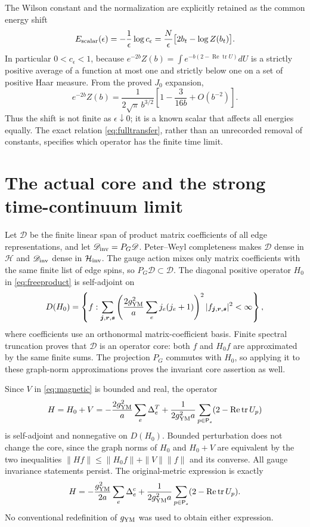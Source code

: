\documentclass[11pt]{article}
\newcommand{\tr}{\operatorname{tr}}
\newcommand{\Rea}{\operatorname{Re}}
\begin{document}
The Wilson constant and the normalization are explicitly retained as the
common energy shift
\begin{equation}\label{eq:shift}
 E_{\rm scalar}(\epsilon)
 =-\frac1\epsilon\log c_\epsilon
 =\frac N\epsilon\bigl[2b_t-\log Z(b_t)\bigr].
\end{equation}
In particular $0<c_\epsilon<1$, because
$e^{-2b}Z(b)=\int e^{-b(2-\Rea\tr U)}dU$ is a strictly positive average
of a function at most one and strictly below one on a set of positive
Haar measure. From the proved $J_0$ expansion,
\[
 e^{-2b}Z(b)=\frac1{2\sqrt\pi\,b^{3/2}}
             \left[1-\frac3{16b}+O(b^{-2})\right].
\]
Thus the shift is not finite as $\epsilon\downarrow0$; it is a known
scalar that affects all energies equally. The exact relation
\eqref{eq:fulltransfer}, rather than an unrecorded removal of constants,
specifies which operator has the finite time limit.

\section{The actual core and the strong time-continuum limit}

Let $\mathscr D$ be the finite linear span of product matrix coefficients
of all edge representations, and let $\mathscr D_{\rm inv}=P_G\mathscr D$.
Peter--Weyl completeness makes $\mathscr D$ dense in $\mathcal H$ and
$\mathscr D_{\rm inv}$ dense in $\mathcal H_{\rm inv}$. The gauge action
mixes only matrix coefficients with the same finite list of edge spins,
so $P_G\mathscr D\subset\mathscr D$. The diagonal positive operator $H_0$
in \eqref{eq:freeproduct} is self-adjoint on
\[
 D(H_0)=\left\{f:\sum_{\boldsymbol j,\boldsymbol r,\boldsymbol s}
 \left(\frac{2g_{\rm YM}^2}{a}\sum_ej_e(j_e+1)\right)^2
 |f_{\boldsymbol j,\boldsymbol r,\boldsymbol s}|^2<\infty\right\},
\]
where coefficients use an orthonormal matrix-coefficient basis.
Finite spectral truncation proves that $\mathscr D$ is an operator core:
both $f$ and $H_0f$ are approximated by the same finite sums. The
projection $P_G$ commutes with $H_0$, so applying it to these graph-norm
approximations proves the invariant core assertion as well.

Since $V$ in \eqref{eq:magnetic} is bounded and real, the operator
\begin{equation}\label{eq:resultH}
 H=H_0+V
 =-\frac{2g_{\rm YM}^2}{a}\sum_e\Delta_e^T
 +\frac1{2g_{\rm YM}^2a}\sum_{p\in\mathsf P_s}(2-\Rea\tr U_p)
\end{equation}
is self-adjoint and nonnegative on $D(H_0)$. Bounded perturbation does
not change the core, since the graph norms of $H_0$ and $H_0+V$ are
equivalent by the two inequalities
$\|Hf\|\leq\|H_0f\|+\|V\|\|f\|$ and its converse. All gauge
invariance statements persist. The original-metric expression is exactly
\begin{equation}\label{eq:resultHc}
 H=-\frac{g_{\rm YM}^2}{2a}\sum_e\Delta_e^c
 +\frac1{2g_{\rm YM}^2a}\sum_{p\in\mathsf P_s}(2-\Rea\tr U_p).
\end{equation}
No conventional redefinition of $g_{\rm YM}$ was used to obtain either
expression.
\end{document}
